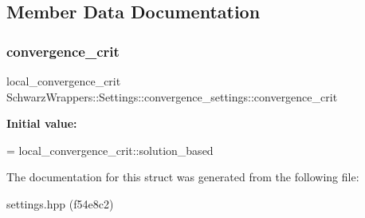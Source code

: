 \subsection{Member Data Documentation}
\mbox{\label{structSchwarzWrappers_1_1Settings_1_1convergence__settings_ac02528dbce2827b664ba9e7545f1cfdc}} 
\subsubsection{\texorpdfstring{convergence\+\_\+crit}{convergence\_crit}}
{\footnotesize\ttfamily local\+\_\+convergence\+\_\+crit Schwarz\+Wrappers\+::\+Settings\+::convergence\+\_\+settings\+::convergence\+\_\+crit}

{\bfseries Initial value\+:}
\begin{DoxyCode}
=
            local\_convergence\_crit::solution\_based
\end{DoxyCode}


The documentation for this struct was generated from the following file\+:\begin{DoxyCompactItemize}
\item 
settings.\+hpp (f54e8c2)\end{DoxyCompactItemize}
